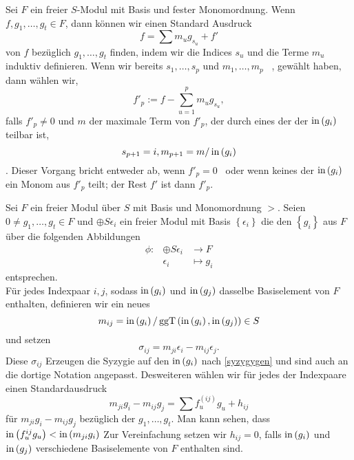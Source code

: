 \documentclass{article}
\begin{document}
	\begin{algo}
		Sei 
		\( F \)
		ein freier 
		\( S\)-Modul
		mit Basis und fester Monomordnung.
		Wenn
		\( f,g_1,\dots,g_t \in F \),
		dann k\"onnen wir einen Standard Ausdruck
		\[
		        f=\sum m_u g_{s_u} +f'
		\]
		von
		\( f \)
		bez\"uglich 
		\( g_1,\dots,g_t \)
		finden,
		indem wir die Indices
		\( s_{u} \)
		und die Terme
		\(m_{u} \)
		induktiv definieren.
		Wenn wir bereits 
		\( s_1,\dots,s_p \)
		und
		\( m_1,\dots,m_p\) \ ,
		gew\"ahlt haben,
		dann w\"ahlen wir, 
		\[
			f'_p:=f-\sum_{u=1}^{p} m_u g_{s_u},
		\]
		falls  
		\( f'_{p} \neq 0 \)
		und
		\( m \) 
		der maximale Term von 
		\(f'_p \),
		der durch eines der der
		\( \operatorname{in}\left( g_i \right) \)
		teilbar ist,
		\[
			s_{p+1}=i , \\
			m_{p+1}=m / \operatorname{in}\left( g_i \right)
		\].
		Dieser Vorgang bricht entweder ab, wenn 
		\( f'_p=0 \) \
		oder wenn keines der
		\( \operatorname{in}\left( g_i \right) \) 
		ein Monom aus 
		\( f'_p\)
		teilt;
		der Rest 
		\(f'\) 
		ist dann 
		\( f'_p \).
	\end{algo}
	
	\begin{nota}
		Sei 
		\( F \) 
		ein freier Modul \"uber
		\(S\)
		mit Basis und Monomordnung
		\( > \).
		Seien
		\( {0 \neq g_{1},\dots,g_{t} \in F} \)
		und 
		\( \oplus S \epsilon_{i} \)
		ein freier Modul mit Basis 
		\( \left\{ \epsilon_{i} \right\} \)
		die den 
		\( \left\{ g_{i} \right\}\)
		aus 
		\( F \)
		\"uber die folgenden Abbildungen 
		\begin{align*}
			\phi:& \oplus S \epsilon_{i} & \to F \\
			& \epsilon_{i} & \mapsto g_{i} 
		\end{align*}
		entsprechen. \\
		F\"ur jedes Indexpaar 
		\( i, j \),
		sodass 
		\( \operatorname{in} \left( g_{i} \right) \)
		und
		\( \operatorname{in} \left( g_{j} \right) \)
		dasselbe Basiselement von
		\( F \)
		enthalten,
		definieren wir ein neues
		\[
			m_{ij} 
			= \operatorname{in} \left( g_{i} \right) 
			/ \operatorname{ggT} \left( \operatorname{in}\left( g_{i} \right), 
			\operatorname{in} \left( g_{j} \right) \right) \in S
		\]
		und setzen
		\[
			\sigma_{ij} 
			= m_{ji} \epsilon_{i} 
			- m_{ij} \epsilon_{j}
		.\]
		Diese 
		\( \sigma_{ij} \)
		Erzeugen die Syzygie auf den 
		\( \operatorname{in} \left( g_{i} \right) \)
		nach \ref{syzygygen} und sind auch an die dortige Notation angepasst.
		Desweiteren w\"ahlen wir f\"ur jedes der Indexpaare einen Standardausdruck 
		\[ 
			m_{ji} g_{i} -m_{ij} g_{j} = \sum f_{u}^{\left( ij \right) } g_{u} + h_{ij}
		\]
		f\"ur 
		\(  m_{ji} g_{i} -m_{ij} g_{j} \)
		bez\"uglich der
		\( g_{1},\dots , g_{t} . \)
		Man kann sehen, 
		dass 
		\( \operatorname{in} \left( f_{u}^{ij} g_{u} \right) < \operatorname{in} \left( m_{ji}g_{i} \right) \)
		Zur Vereinfachung setzen wir
		\( h_{ij} = 0 \),
		falls 
		\( \operatorname{in}\left( g_{i} \right) \)
		und 
		\( \operatorname{in}\left( g_{j} \right) \)
		verschiedene Basiselemente von 
		\( F \)
		enthalten sind.
	\end{nota}
\end{document}
